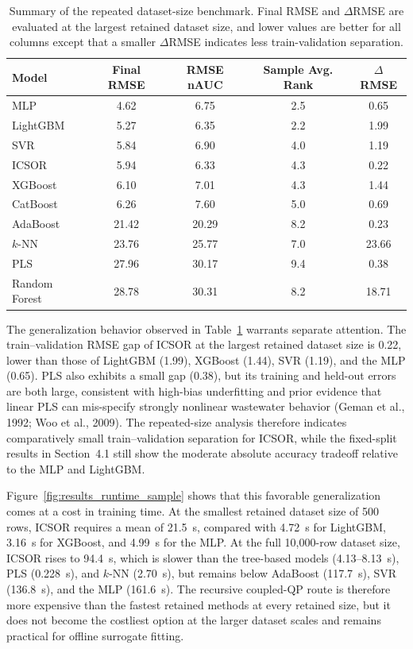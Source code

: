 \documentclass[a4paper,fleqn]{cas-sc}
\newenvironment{revblock}{}{}
\newenvironment{revblockr25}{}{}
\begin{document}
\begin{revblock}
\begin{revblockr25}
\begin{table}[htbp]
\centering
\caption{Summary of the repeated dataset-size benchmark. Final RMSE and $\Delta$RMSE are evaluated at the largest retained dataset size, and lower values are better for all columns except that a smaller $\Delta$RMSE indicates less train-validation separation.}
\label{tab:results_scaling_sample}
\scriptsize
\begin{tabular}{lcccc}
\hline
Model & Final RMSE & RMSE nAUC & Sample Avg. Rank & $\Delta$RMSE \\
\hline
MLP & 4.62 & 6.75 & 2.5 & 0.65 \\
LightGBM & 5.27 & 6.35 & 2.2 & 1.99 \\
SVR & 5.84 & 6.90 & 4.0 & 1.19 \\
ICSOR & 5.94 & 6.33 & 4.3 & 0.22 \\
XGBoost & 6.10 & 7.01 & 4.3 & 1.44 \\
CatBoost & 6.26 & 7.60 & 5.0 & 0.69 \\
AdaBoost & 21.42 & 20.29 & 8.2 & 0.23 \\
$k$-NN & 23.76 & 25.77 & 7.0 & 23.66 \\
PLS & 27.96 & 30.17 & 9.4 & 0.38 \\
Random Forest & 28.78 & 30.31 & 8.2 & 18.71 \\
\hline
\end{tabular}
\end{table}

The generalization behavior observed in Table~\ref{tab:results_scaling_sample} warrants separate attention. The train--validation RMSE gap of ICSOR at the largest retained dataset size is 0.22, lower than those of LightGBM (1.99), XGBoost (1.44), SVR (1.19), and the MLP (0.65). PLS also exhibits a small gap (0.38), but its training and held-out errors are both large, consistent with high-bias underfitting and prior evidence that linear PLS can mis-specify strongly nonlinear wastewater behavior (Geman et al., 1992; Woo et al., 2009). The repeated-size analysis therefore indicates comparatively small train--validation separation for ICSOR, while the fixed-split results in Section~4.1 still show the moderate absolute accuracy tradeoff relative to the MLP and LightGBM.

Figure~\ref{fig:results_runtime_sample} shows that this favorable generalization comes at a cost in training time. At the smallest retained dataset size of 500 rows, ICSOR requires a mean of 21.5~s, compared with 4.72~s for LightGBM, 3.16~s for XGBoost, and 4.99~s for the MLP. At the full 10,000-row dataset size, ICSOR rises to 94.4~s, which is slower than the tree-based models (4.13--8.13~s), PLS (0.228~s), and $k$-NN (2.70~s), but remains below AdaBoost (117.7~s), SVR (136.8~s), and the MLP (161.6~s). The recursive coupled-QP route is therefore more expensive than the fastest retained methods at every retained size, but it does not become the costliest option at the larger dataset scales and remains practical for offline surrogate fitting.


\end{revblockr25}
\end{revblock}
\end{document}
